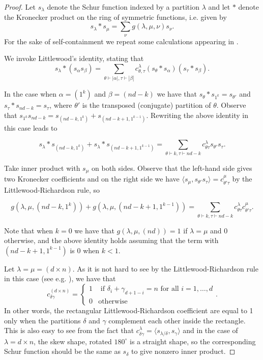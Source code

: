 \documentclass{article}
\numberwithin{equation}{section}
\theoremstyle{definition}
\begin{document}
\begin{proof}
Let $s_{\lambda}$ denote the Schur function indexed by a partition $\lambda$ and let $*$ denote the Kronecker product on the ring of symmetric functions, i.e. given by
$$s_{\lambda} * s_{\mu} = \sum_{\nu} g(\lambda,\mu,\nu) s_{\nu}.$$
For the sake of self-containment we repeat some calculations appearing in \cite{bla:12,liu:14,pp:14}. 

We invoke Littlewood's identity, stating that
$$s_{\lambda}*(s_{\alpha} s_{\beta}) = \sum_{\theta \vdash |\alpha|, \tau \vdash |\beta|} c^{\lambda}_{\theta,\tau} (s_\theta * s_\alpha) (s_\tau *s_\beta).$$

In the case when $\alpha = (1^k)$ and $\beta=(nd-k)$ we have that $s_\theta *s_{1^k} = s_{\theta'}$ and $s_\tau * s_{nd-k} = s_\tau$, where $\theta'$ is the transposed (conjugate) partition of $\theta$. Observe that $s_{1^k} s_{nd-k} = s_{(nd-k,1^k)} + s_{(nd-k+1,1^{k-1})}$. Rewriting the above identity in this case leads to

$$s_{\lambda}*s_{(nd-k,1^k)} +s_{\lambda}*s_{(nd-k+1,1^{k-1} )} = \sum_{\theta \vdash k, \tau \vdash nd-k} c^{\lambda}_{\theta \tau} s_{\theta'} s_{\tau}.$$

Take inner product with $s_{\mu}$ on both sides. Observe that the left-hand side gives two Kronecker coefficients and on the right side we have $\langle s_\mu, s_{\theta'} s_{\tau} \rangle = c^{\mu}_{\theta'\tau}$ by the Littlewood-Richardson rule, so

\begin{equation}\label{eq:Lit_hook}
 g(\lambda,\mu, (nd-k,1^k) ) + g(\lambda,\mu, (nd-k+1,1^{k-1} ) ) =  \sum_{\theta \vdash k, \tau \vdash nd-k} c^{\lambda}_{\theta \tau} c^{\mu}_{\theta'\tau}.
 \end{equation}

Note that when $k=0$ we have that $g(\lambda,\mu, (nd) ) =1$ if $\lambda=\mu$ and $0$ otherwise, and the above identity holds assuming that the term with $(nd - k +1, 1^{k-1})$ is 0 when $k<1$. 

Let $\lambda=\mu=(d\times n)$. As it is not hard to see by the Littlewood-Richardson rule in this case (see e.g. \cite{pp:14}), we have that 
$$c^{ (d\times n)}_{\delta \gamma} = \begin{cases} 1 & \text{ if }\delta_i + \gamma_{d+1-i} = n \text{ for all $i=1,\ldots,d$} \\ 0 & \text{otherwise} \end{cases}.$$
In other words, the rectangular  Littlewood-Richardson coefficient are equal to 1 only when the partitions $\delta$ and $\gamma$ complement each other inside the rectangle. This is also easy to see from the  fact that $c^{\lambda}_{\delta \gamma} = \langle s_{\lambda/\delta}, s_\gamma\rangle$ and in the case of $\lambda=d \times n$, the skew shape, rotated $180^\circ$ is a straight shape, so the corresponding Schur function should be the same as $s_\delta$ to give nonzero inner product. 


\end{proof}
\end{document}
